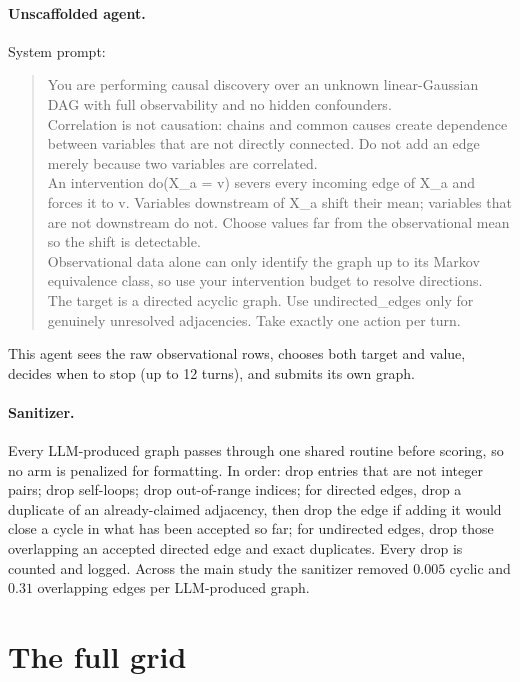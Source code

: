 \documentclass{article}
\begin{document}
\paragraph{Unscaffolded agent.} System prompt:

\begin{quote}\small\ttfamily\raggedright
You are performing causal discovery over an unknown linear-Gaussian DAG with full
observability and no hidden confounders.\\
Correlation is not causation: chains and common causes create dependence between variables
that are not directly connected. Do not add an edge merely because two variables are
correlated.\\
An intervention do(X\_a = v) severs every incoming edge of X\_a and forces it to v. Variables
downstream of X\_a shift their mean; variables that are not downstream do not. Choose values
far from the observational mean so the shift is detectable.\\
Observational data alone can only identify the graph up to its Markov equivalence class, so
use your intervention budget to resolve directions.\\
The target is a directed acyclic graph. Use undirected\_edges only for genuinely unresolved
adjacencies. Take exactly one action per turn.
\end{quote}

\noindent This agent sees the raw observational rows, chooses both target and value, decides
when to stop (up to 12 turns), and submits its own graph.

\paragraph{Sanitizer.} Every LLM-produced graph passes through one shared routine before
scoring, so no arm is penalized for formatting. In order: drop entries that are not integer
pairs; drop self-loops; drop out-of-range indices; for directed edges, drop a duplicate of an
already-claimed adjacency, then drop the edge if adding it would close a cycle in what has
been accepted so far; for undirected edges, drop those overlapping an accepted directed edge
and exact duplicates. Every drop is counted and logged. Across the main study the sanitizer
removed $0.005$ cyclic and $0.31$ overlapping edges per LLM-produced graph.

\section{The full grid}
\label{app:grid}
\end{document}
